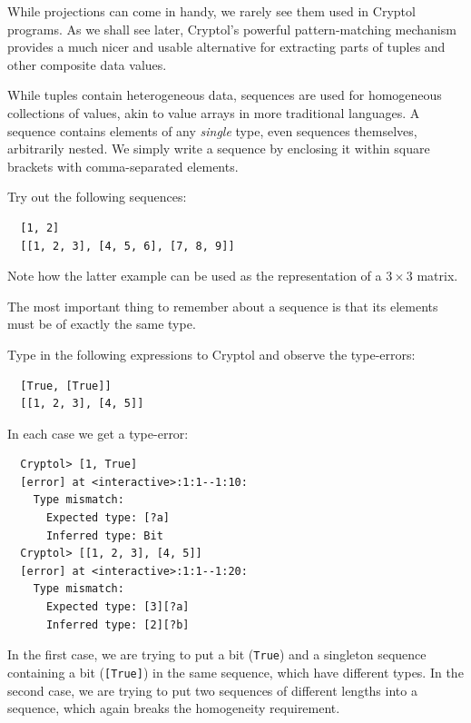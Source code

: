 \begin{tip}
  While projections can come in handy, we rarely see them used in
  Cryptol programs. As we shall see later, Cryptol's powerful
  pattern-matching mechanism provides a much nicer and usable
  alternative for extracting parts of tuples and other composite data
  values.
\end{tip}


While tuples contain heterogeneous data, sequences are used for
homogeneous collections of values, akin to value arrays in more
traditional languages.  A sequence contains elements of any
\emph{single} type, even sequences themselves, arbitrarily nested.  We
simply write a sequence by enclosing it within square brackets with
comma-separated elements.\indTheSequenceType

\begin{Exercise}\label{ex:seq:1}
Try out the following sequences:
\begin{Verbatim}
  [1, 2]
  [[1, 2, 3], [4, 5, 6], [7, 8, 9]]
\end{Verbatim}
Note how the latter example can be used as the representation of a
$3\times3$ matrix.
\end{Exercise}

\begin{tip}
  The most important thing to remember about a sequence is that its
  elements must be of exactly the same type.
\end{tip}

\begin{Exercise}\label{ex:seq:2}
  Type in the following expressions to Cryptol and observe the
  type-errors:
\begin{Verbatim}
  [True, [True]]
  [[1, 2, 3], [4, 5]]
\end{Verbatim}
\end{Exercise}
\begin{Answer}
In each case we get a type-error:
\begin{Verbatim}
  Cryptol> [1, True]
  [error] at <interactive>:1:1--1:10:
    Type mismatch:
      Expected type: [?a]
      Inferred type: Bit
  Cryptol> [[1, 2, 3], [4, 5]]
  [error] at <interactive>:1:1--1:20:
    Type mismatch:
      Expected type: [3][?a]
      Inferred type: [2][?b]
\end{Verbatim}
In the first case, we are trying to put a bit ({\tt True}) and a
singleton sequence containing a bit ({\tt [True]}) in the same
sequence, which have different types. In the second case, we are
trying to put two sequences of different lengths into a sequence,
which again breaks the homogeneity requirement.
\end{Answer}

